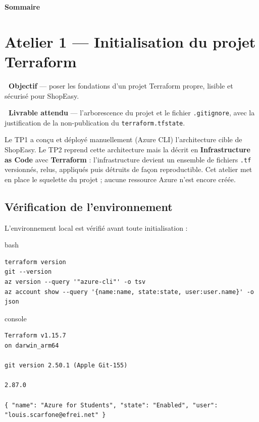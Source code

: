 \documentclass[11pt,a4paper]{article}
\newcommand{\emo}[1]{\raisebox{-0.14em}{\twemoji{#1}}}
\newcommand{\eTarget}{\emo{1f3af}}
\newcommand{\ePackage}{\emo{1f4e6}}
\newcommand{\code}[1]{\texttt{#1}}
\begin{document}
\thispagestyle{fancy}
{\sffamily\Huge\bfseries\color{azuredark}Sommaire}
\vspace{2mm}{\color{azure}\titlerule[1.6pt]}\vspace{4mm}
\hypersetup{linkcolor=azuredark}
{\setlength{\parskip}{1pt}\tableofcontents}
\newpage


\section{Atelier 1 — Initialisation du projet Terraform}

\begin{fiche}
\textbf{\eTarget~Objectif} — poser les fondations d'un projet Terraform propre, lisible et sécurisé pour ShopEasy.

\textbf{\ePackage~Livrable attendu} — l'arborescence du projet et le fichier \code{.gitignore}, avec la justification de la non-publication du \code{terraform.tfstate}.
\end{fiche}

Le TP1 a conçu et déployé manuellement (Azure CLI) l'architecture cible de ShopEasy. Le TP2 reprend cette
architecture mais la décrit en \textbf{Infrastructure as Code} avec \textbf{Terraform} : l'infrastructure
devient un ensemble de fichiers \code{.tf} versionnés, relus, appliqués puis détruits de façon reproductible.
Cet atelier met en place le squelette du projet ; aucune ressource Azure n'est encore créée.

\subsection{Vérification de l'environnement}
L'environnement local est vérifié avant toute initialisation :
\begin{codebox}{bash}
\begin{Verbatim}
terraform version
git --version
az version --query '"azure-cli"' -o tsv
az account show --query '{name:name, state:state, user:user.name}' -o json
\end{Verbatim}
\end{codebox}

\begin{codebox}{console}
\begin{Verbatim}
Terraform v1.15.7
on darwin_arm64

git version 2.50.1 (Apple Git-155)

2.87.0

{ "name": "Azure for Students", "state": "Enabled", "user": "louis.scarfone@efrei.net" }
\end{Verbatim}
\end{codebox}
\end{document}
